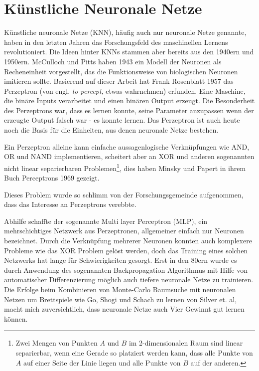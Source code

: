 \section{Künstliche Neuronale Netze}
\label{chap:networks}
Künstliche neuronale Netze (KNN), häufig auch nur neuronale Netze genannte, haben in den letzten Jahren das Forschungsfeld des maschinellen Lernens revolutioniert.
Die Ideen hinter KNNs stammen aber bereits aus den 1940ern und 1950ern.
McCulloch und Pitts haben 1943 ein Modell der Neuronen als Recheneinheit vorgestellt, das die Funktionsweise von biologischen Neuronen imitieren sollte.
Basierend auf dieser Arbeit hat Frank Rosenblatt 1957 das Perzeptron (von engl. \textit{to percept}, etwas wahrnehmen) erfunden.
Eine Maschine, die binäre Inputs verarbeitet und einen binären Output erzeugt.
Die Besonderheit des Perzeptrons war, dass es lernen konnte, seine Parameter anzupassen wenn der erzeugte Output falsch war - es konnte lernen.
Das Perzeptron ist auch heute noch die Basis für die Einheiten, aus denen neuronale Netze bestehen.

\par
Ein Perzeptron alleine kann einfache aussagenlogische Verknüpfungen wie AND, OR und NAND implementieren, scheitert aber an XOR und anderen sogenannten nicht linear separierbaren Problemen\footnote{Zwei Mengen von Punkten $A$ und $B$ im 2-dimensionalen Raum sind linear separierbar, wenn eine Gerade so platziert werden kann, dass alle Punkte von $A$ auf einer Seite der Linie liegen und alle Punkte von $B$ auf der anderen.}, dies haben Minsky und Papert in ihrem Buch Perceptrons 1969 gezeigt.

Dieses Problem wurde so schlimm von der Forschungsgemeinde aufgenommen, dass das Interesse an Perzeptrons verebbte.

Abhilfe schaffte der sogenannte Multi layer Perceptron (MLP), ein mehrschichtiges Netzwerk aus Perzeptronen, allgemeiner einfach nur Neuronen bezeichnet. Durch die Verknüpfung mehrerer Neuronen konnten auch komplexere Probleme wie das XOR Problem gelöst werden, doch das Training eines solchen Netzwerks hat lange für Schwierigkeiten gesorgt. Erst in den 80ern wurde es durch Anwendung des sogenannten Backpropagation Algorithmus mit Hilfe von automatischer Differenzierung möglich auch tiefere neuronale Netze zu trainieren.\\

Die Erfolge beim Kombinieren von Monte-Carlo Baumsuche mit neuronalen Netzen um Brettspiele wie Go, Shogi und Schach zu lernen von Silver et. al\cite{silverMastering}, macht mich zuversichtlich, dass neuronale Netze auch Vier Gewinnt gut lernen können.

